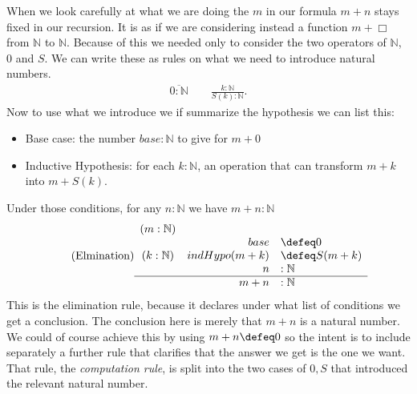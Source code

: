 When we look carefully at what we are doing the $m$ in our formula $m+n$ 
stays fixed in our recursion.  It is as if we are considering 
instead a function $m+\Box$ from $\mathbb{N}$ to $\mathbb{N}$.
Because of this we needed only to consider the two operators of $\mathbb{N}$,
$0$ and $S$.  We can write these as rules on what we need to introduce 
natural numbers.
\begin{gather}
    \tag{Introduction}
    \overline{0:\mathbb{N}}\qquad \frac{k:\mathbb{N}}{S(k):\mathbb{N}}.
\end{gather}
Now to use what we introduce we if summarize the hypothesis we can list this:
\begin{itemize}
    \item Base case: the number $base:\mathbb{N}$ to give for $m+0$
    \item Inductive Hypothesis: for each $k:\mathbb{N}$, an operation 
    that can transform $m+k$ into $m+S(k)$.
\end{itemize}
Under those conditions, for any $n:\mathbb{N}$ we have $m+n:\mathbb{N}$
\begin{gather}
    \tag{Elmination}
    \begin{array}{crl}
        (m:\mathbb{N}) & & \\ %
         & base &\defeq 0\\
        (k:\mathbb{N}) &  indHypo(m+k) & \defeq S(m+k)\\
        & n & :\mathbb{N}\\
        \hline 
        & m+n & :\mathbb{N}
    \end{array}
\end{gather}
This is the elimination rule, because it declares under what list of 
conditions we get a conclusion.  The conclusion here is merely that 
$m+n$ is a natural number.  We could of course achieve this by 
using $m+n\defeq 0$ so the intent is to include separately a further 
rule that clarifies that the answer we get is the one we want.
That rule, the \emph{computation rule}, is split into the two cases 
of $0,S$ that introduced the relevant natural number.
